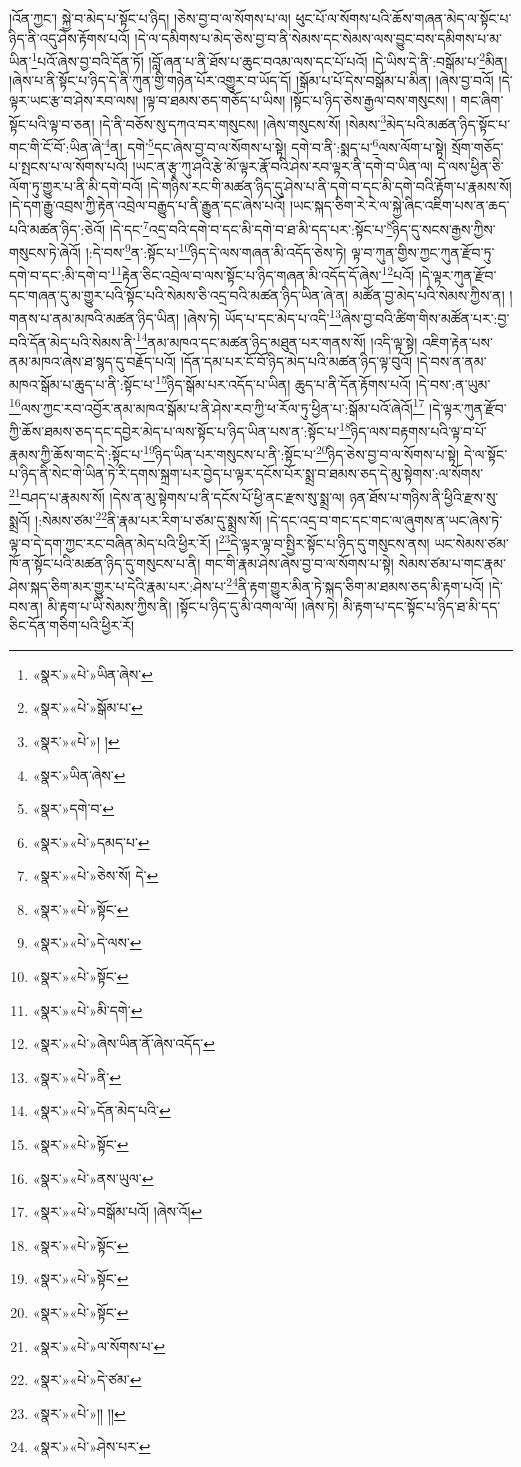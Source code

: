 །འོན་ཀྱང་། སྐྱེ་བ་མེད་པ་སྟོང་པ་ཉིད། །ཅེས་བྱ་བ་ལ་སོགས་པ་ལ། ཕུང་པོ་ལ་སོགས་པའི་ཆོས་གཞན་མེད་ལ་སྟོང་པ་ཉིད་ནི་འདུ་ཤེས་རྟོགས་པའོ། །དེ་ལ་དམིགས་པ་མེད་ཅེས་བྱ་བ་ནི་སེམས་དང་སེམས་ལས་བྱུང་བས་དམིགས་པ་མ་ཡིན་\footnote{«སྣར་»«པེ་»ཡིན་ཞེས་}པའོ་ཞེས་བྱ་བའི་དོན་ཏོ། །བློ་ཞན་པ་ནི་ཐོས་པ་ཆུང་བའམ་ལས་དང་པོ་པའོ། །དེ་ཡིས་དེ་ནི་:བསྒོམ་པ་\footnote{«སྣར་»«པེ་»སྒོམ་པ་}མིན། །ཞེས་པ་ནི་སྟོང་པ་ཉིད་དེ་ནི་ཀུན་གྱི་གཉེན་པོར་འགྱུར་བ་ཡོད་དོ། །སྒོམ་པ་པོ་དེས་བསྒོམ་པ་མིན། །ཞེས་བྱ་བའོ། །དེ་ལྟར་ཡང་རྩ་བ་ཤེས་རབ་ལས། །ལྟ་བ་ཐམས་ཅད་གཅོད་པ་ཡིས། །སྟོང་པ་ཉིད་ཅེས་རྒྱལ་བས་གསུངས། །
གང་ཞིག་སྟོང་པའི་ལྟ་བ་ཅན། །དེ་ནི་བཅོས་སུ་དཀའ་བར་གསུངས། །ཞེས་གསུངས་སོ། །སེམས་\footnote{«སྣར་»«པེ་»། །}མེད་པའི་མཚན་ཉིད་སྟོང་པ་གང་གི་ངོ་བོ་:ཡིན་ཞེ་\footnote{«སྣར་»ཡིན་ཞེས་}ན། དགེ་\footnote{«སྣར་»དགེ་བ་}དང་ཞེས་བྱ་བ་ལ་སོགས་པ་སྟེ། དགེ་བ་ནི་:སྨད་པ་\footnote{«སྣར་»«པེ་»དམད་པ་}ལས་ལོག་པ་སྟེ། སྲོག་གཅོད་པ་སྤངས་པ་ལ་སོགས་པའོ། །ཡང་ན་རྩྭ་ཀུ་ཤའི་རྩེ་མོ་ལྟར་རྣོ་བའི་ཤེས་རབ་ལྟར་ནི་དགེ་བ་ཡིན་ལ། དེ་ལས་ཕྱིན་ཅི་ལོག་ཏུ་གྱུར་པ་ནི་མི་དགེ་བའོ། །དེ་གཉིས་རང་གི་མཚན་ཉིད་དུ་ཤེས་པ་ནི་དགེ་བ་དང་མི་དགེ་བའི་རྟོག་པ་རྣམས་སོ། །དེ་དག་རྒྱུ་འབྲས་ཀྱི་རྟེན་འབྲེལ་བརྒྱུད་པ་ནི་རྒྱུན་དང་ཞེས་པའོ། །ཡང་སྐད་ཅིག་རེ་རེ་ལ་སྐྱེ་ཞིང་འཇིག་པས་ན་ཆད་པའི་མཚན་ཉིད་:ཅེའོ། །དེ་དང་\footnote{«སྣར་»«པེ་»ཅེས་སོ། དེ་}འདྲ་བའི་དགེ་བ་དང་མི་དགེ་བ་ཐ་མི་དད་པར་:སྟོང་པ་\footnote{«སྣར་»«པེ་»སྟོང་}ཉིད་དུ་སངས་རྒྱས་ཀྱིས་གསུངས་ཏེ་ཞེའོ། །:དེ་བས་\footnote{«སྣར་»«པེ་»དེ་ལས་}ན་:སྟོང་པ་\footnote{«སྣར་»«པེ་»སྟོང་}ཉིད་དེ་ལས་གཞན་མི་འདོད་ཅེས་ཏེ། ལྟ་བ་ཀུན་གྱིས་ཀྱང་ཀུན་རྫོབ་ཏུ་དགེ་བ་དང་:མི་དགེ་བ་\footnote{«སྣར་»«པེ་»མི་དགེ་}རྟེན་ཅིང་འབྲེལ་བ་ལས་སྟོང་པ་ཉིད་གཞན་མི་འདོད་དོ་ཞེས་\footnote{«སྣར་»«པེ་»ཞེས་ཡིན་ནོ་ཞེས་འདོད་}པའོ། །དེ་ལྟར་ཀུན་རྫོབ་དང་གཞན་དུ་མ་གྱུར་པའི་སྟོང་པའི་སེམས་ཅི་འདྲ་བའི་མཚན་ཉིད་ཡིན་ཞེ་ན། མཚོན་བྱ་མེད་པའི་སེམས་ཀྱིས་ན། །གནས་པ་ནམ་མཁའི་མཚན་ཉིད་ཡིན། །ཞེས་ཏེ། ཡོད་པ་དང་མེད་པ་འདི་\footnote{«སྣར་»«པེ་»ནི་}ཞེས་བྱ་བའི་ཚིག་གིས་མཚོན་པར་:བྱ་བའི་དོན་མེད་པའི་སེམས་ནི་\footnote{«སྣར་»«པེ་»དོན་མེད་པའི་}ནམ་མཁའ་དང་མཚན་ཉིད་མཐུན་པར་གནས་སོ། །འདི་ལྟ་སྟེ། འཇིག་རྟེན་པས་ནམ་མཁའ་ཞེས་ཐ་སྙད་དུ་བརྗོད་པའོ། །དོན་དམ་པར་ངོ་བོ་ཉིད་མེད་པའི་མཚན་ཉིད་ལྟ་བུའོ། །དེ་བས་ན་ནམ་མཁའ་སྒོམ་པ་ཆུད་པ་ནི་:སྟོང་པ་\footnote{«སྣར་»«པེ་»སྟོང་}ཉིད་སྒོམ་པར་འདོད་པ་ཡིན། ཆུད་པ་ནི་དོན་རྟོགས་པའོ། །དེ་བས་:ན་ཡུམ་\footnote{«སྣར་»«པེ་»ནས་ཡུལ་}ལས་ཀྱང་རབ་འབྱོར་ནམ་མཁའ་སྒོམ་པ་ནི་ཤེས་རབ་ཀྱི་ཕ་རོལ་ཏུ་ཕྱིན་པ་:སྒོམ་པའོ་ཞེའོ།\footnote{«སྣར་»«པེ་»བསྒོམ་པའོ། །ཞེས་འོ།} །དེ་ལྟར་ཀུན་རྫོབ་ཀྱི་ཆོས་ཐམས་ཅད་དང་དབྱེར་མེད་པ་ལས་སྟོང་པ་ཉིད་ཡིན་པས་ན་:སྟོང་པ་\footnote{«སྣར་»«པེ་»སྟོང་}ཉིད་ལས་བརྟགས་པའི་ལྟ་བ་པོ་རྣམས་ཀྱི་ཆོས་གང་དེ་:སྟོང་པ་\footnote{«སྣར་»«པེ་»སྟོང་}ཉིད་ཡིན་པར་གསུངས་པ་ནི་:སྟོང་པ་\footnote{«སྣར་»«པེ་»སྟོང་}ཉིད་ཅེས་བྱ་བ་ལ་སོགས་པ་སྟེ། དེ་ལ་སྟོང་པ་ཉིད་ནི་སེང་གེ་ཡིན་ཏེ་རི་དགས་སྐྲག་པར་བྱེད་པ་ལྟར་དངོས་པོར་སྨྲ་བ་ཐམས་ཅད་དེ་མུ་སྟེགས་:ལ་སོགས་\footnote{«སྣར་»«པེ་»ལ་སོགས་པ་}བཤད་པ་རྣམས་སོ། །དེས་ན་མུ་སྟེགས་པ་ནི་དངོས་པོ་ཕྱི་ནང་རྫས་སུ་སྨྲ་ལ། ཉན་ཐོས་པ་གཉིས་ནི་ཕྱིའི་རྫས་སུ་སྨྲའོ། །:སེམས་ཙམ་\footnote{«སྣར་»«པེ་»དེ་ཙམ་}ནི་རྣམ་པར་རིག་པ་ཙམ་དུ་སྨྲས་སོ། །དེ་དང་འདྲ་བ་གང་དང་གང་ལ་ཞུགས་ན་ཡང་ཞེས་ཏེ་ལྟ་བ་དེ་དག་ཀྱང་རང་བཞིན་མེད་པའི་ཕྱིར་རོ། །\footnote{«སྣར་»«པེ་»།། །།}དེ་ལྟར་ལྟ་བ་སྤྱིར་སྟོང་པ་ཉིད་དུ་གསུངས་ནས། ཡང་སེམས་ཙམ་ཁོ་ན་སྟོང་པའི་མཚན་ཉིད་དུ་གསུངས་པ་ནི། གང་གི་རྣམ་ཤེས་ཞེས་བྱ་བ་ལ་སོགས་པ་སྟེ། སེམས་ཙམ་པ་གང་རྣམ་ཤེས་སྐད་ཅིག་མར་གྱུར་པ་དེའི་རྣམ་པར་:ཤེས་པ་\footnote{«སྣར་»«པེ་»ཤེས་པར་}ནི་རྟག་གྱུར་མིན་ཏེ་སྐད་ཅིག་མ་ཐམས་ཅད་མི་རྟག་པའོ། །དེ་བས་ན། མི་རྟག་པ་ཡི་སེམས་ཀྱིས་ནི། །སྟོང་པ་ཉིད་དུ་མི་འགལ་ལོ། །ཞེས་ཏེ། མི་རྟག་པ་དང་སྟོང་པ་ཉིད་ཐ་མི་དད་ཅིང་དོན་གཅིག་པའི་ཕྱིར་རོ། 